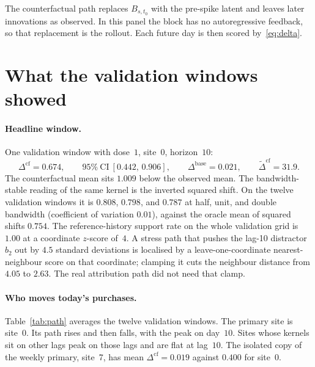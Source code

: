 \documentclass[11pt]{article}
\begin{document}
The counterfactual path replaces $B_{s,t_0}$ with the pre-spike latent and leaves later innovations as observed.
In this panel the block has no autoregressive feedback, so that replacement is the rollout.
Each future day is then scored by~\eqref{eq:delta}.

\section{What the validation windows showed}
\label{sec:results}

\paragraph{Headline window.}
One validation window with dose~$1$, site~0, horizon~$10$:
\begin{equation}
\label{eq:headline}
\Delta^{\mathrm{cf}}=0.674,
\qquad
95\%\ \mathrm{CI}\ [0.442,\,0.906],
\qquad
\Delta^{\mathrm{base}}=0.021,
\qquad
\widetilde\Delta^{\mathrm{cf}}=31.9 .
\end{equation}
The counterfactual mean sits $1.009$ below the observed mean.
The bandwidth-stable reading of the same kernel is the inverted squared shift.
On the twelve validation windows it is $0.808$, $0.798$, and $0.787$ at half, unit, and double bandwidth (coefficient of variation $0.01$), against the oracle mean of squared shifts $0.754$.
The reference-history support rate on the whole validation grid is $1.00$ at a coordinate $z$-score of~$4$.
A stress path that pushes the lag-10 distractor $b_2$ out by $4.5$ standard deviations is localised by a leave-one-coordinate nearest-neighbour score on that coordinate; clamping it cuts the neighbour distance from $4.05$ to $2.63$.
The real attribution path did not need that clamp.

\paragraph{Who moves today's purchases.}
Table~\ref{tab:path} averages the twelve validation windows.
The primary site is site~0.
Its path rises and then falls, with the peak on day~$10$.
Sites whose kernels sit on other lags peak on those lags and are flat at lag~$10$.
The isolated copy of the weekly primary, site~7, has mean $\Delta^{\mathrm{cf}}=0.019$ against $0.400$ for site~0.
\end{document}
